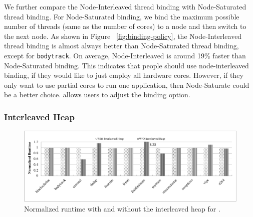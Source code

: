 We further compare the Node-Interleaved thread binding with Node-Saturated thread binding. For Node-Saturated binding, we bind the maximum possible number of threads (same as the number of cores) to a node and then switch to the next node. As shown in Figure ~\ref{fig:binding-policy}, the Node-Interleaved thread binding is almost always better than Node-Saturated thread binding, except for \texttt{bodytrack}. On average, Node-Interleaved is around 19\% faster than Node-Saturated binding. This indicates that people should use node-interleaved binding, if they would like to just employ all hardware cores. However, if they only want to use partial cores to run one application, then Node-Saturate could be a better choice. \NM{} allows users to adjust the binding option.  



\subsubsection{Interleaved Heap} 
\label{sec:interleavedheap}

\begin{figure}[!ht]
    \centering
    \includegraphics[width=5.5in]{figure/interleavedheap.pdf}
    \caption{Normalized runtime with and without the interleaved heap for \NM{}.  \label{fig:interleavedheap}}  
\end{figure}




